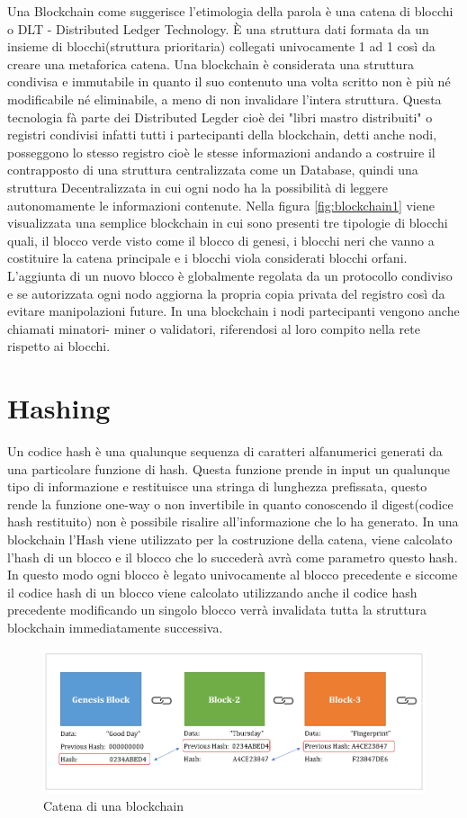 \documentclass[12pt]{report}
\begin{document}
Una Blockchain come suggerisce l'etimologia della parola è una catena di blocchi o DLT - Distributed Ledger Technology. È una struttura dati formata da un insieme di blocchi(struttura prioritaria) collegati univocamente 1 ad 1 così da creare una metaforica catena. Una blockchain è considerata una struttura condivisa e immutabile in quanto il suo contenuto una volta scritto non è più né modificabile né eliminabile, a meno di non invalidare l'intera struttura. Questa tecnologia fà parte dei Distributed Legder cioè dei "libri mastro distribuiti" o registri condivisi infatti tutti i partecipanti della blockchain, detti anche nodi, posseggono lo stesso registro cioè le stesse informazioni andando a costruire il contrapposto di una struttura centralizzata come un Database, quindi una struttura Decentralizzata in cui ogni nodo ha la possibilità di leggere autonomamente le informazioni contenute.
Nella figura \ref{fig:blockchain1} viene visualizzata una semplice blockchain in cui sono presenti tre tipologie di blocchi quali, il blocco verde visto come il blocco di genesi, i blocchi neri che vanno a costituire la catena principale e i blocchi viola considerati blocchi orfani. L'aggiunta di un nuovo blocco è globalmente regolata da un protocollo condiviso e se autorizzata ogni nodo aggiorna la propria copia privata del registro così da evitare manipolazioni future. In una blockchain i nodi partecipanti vengono anche chiamati minatori- miner o validatori, riferendosi al loro compito nella rete rispetto ai blocchi.

\section{Hashing}
Un codice hash è una qualunque sequenza di caratteri alfanumerici generati da una particolare funzione di hash. Questa funzione prende in input un qualunque tipo di informazione e restituisce una stringa di lunghezza prefissata, questo rende la funzione one-way o non invertibile in quanto conoscendo il digest(codice hash restituito) non è possibile risalire all'informazione che lo ha generato. In una blockchain l'Hash viene utilizzato per la costruzione della catena, viene calcolato l'hash di un blocco e il blocco che lo succederà avrà come parametro questo hash. In questo modo ogni blocco è legato univocamente al blocco precedente e siccome il codice hash di un blocco viene calcolato utilizzando anche il codice hash precedente modificando un singolo blocco verrà invalidata tutta la struttura blockchain immediatamente successiva.
\begin{figure}[h]
	\includegraphics[width=\textwidth]{bc1}
	\centering
	\caption{Catena di una blockchain}
	\label{fig:blockchain2}
\end{figure}
\end{document}

